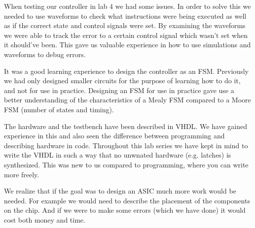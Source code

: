 \documentclass[a4paper,11pt]{article}
\begin{document}
When testing our controller in lab 4 we had some issues. In order to solve this we needed to use waveforms to check what instructions were being executed as well as if the correct state and control signals were set. By examining the waveforms we were able to track the error to a certain control signal which wasn't set when it should've been. This gave us valuable experience in how to use simulations and waveforms to debug errors.

It was a good learning experience to design the controller as an FSM. Previously we had only designed smaller circuits for the purpose of learning how to do it, and not for use in practice. Designing an FSM for use in practice gave use a better understanding of the characteristics of a Mealy FSM compared to a Moore FSM (number of states and timing).

The hardware and the testbench have been described in VHDL. We have gained experience in this and also seen the difference between programming and describing hardware in code. Throughout this lab series we have kept in mind to write the VHDL in such a way that no unwnated  hardware (e.g. latches) is synthesized. This was new to us compared to programming, where you can write more freely.

We realize that if the goal was to design an ASIC much more work would be needed. For example we would need to describe the placement of the components on the chip. And if we were to make some errors (which we have done) it would cost both money and time.
\end{document}
